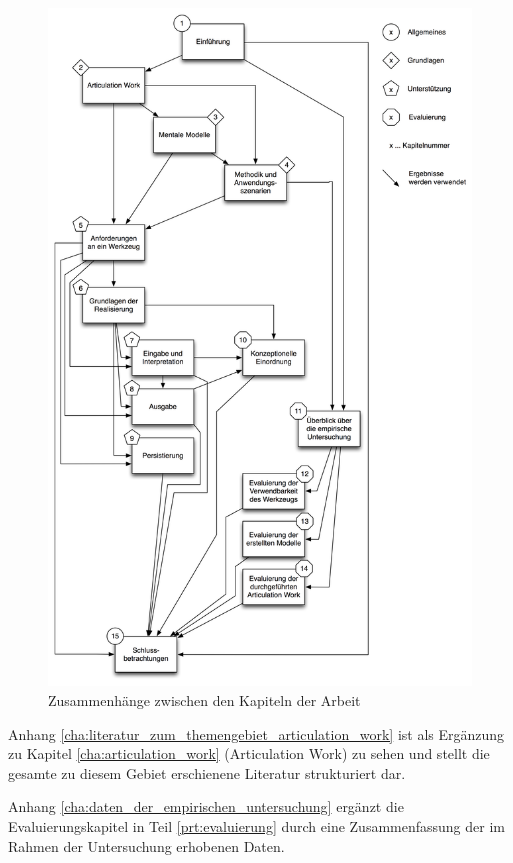 \begin{figure}[htbp]
	\centering
		\includegraphics[height=0.9\textheight]{img/Einfuehrung/gesamtueberblick.png}
	\caption{Zusammenhänge zwischen den Kapiteln der Arbeit}
	\label{fig:img_Einfuehrung_gesamtueberblick}
\end{figure}

Anhang \ref{cha:literatur_zum_themengebiet_articulation_work} ist als Ergänzung zu Kapitel \ref{cha:articulation_work} (Articulation Work) zu sehen und stellt die gesamte zu diesem Gebiet erschienene Literatur strukturiert dar.

Anhang \ref{cha:daten_der_empirischen_untersuchung} ergänzt die Evaluierungskapitel in Teil \ref{prt:evaluierung} durch eine Zusammenfassung der im Rahmen der Untersuchung erhobenen Daten.

